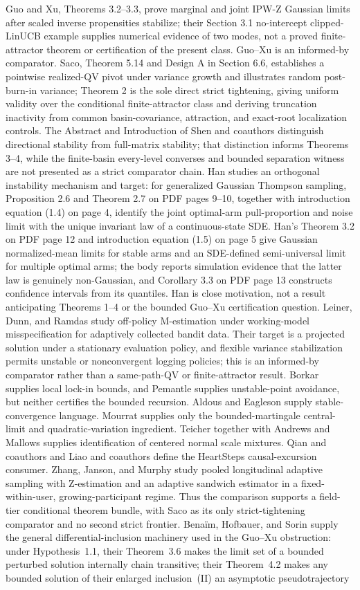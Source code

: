 Guo and Xu, Theorems 3.2--3.3, prove marginal and joint IPW-Z Gaussian limits after scaled inverse propensities stabilize; their Section 3.1 no-intercept clipped-LinUCB example supplies numerical evidence of two modes, not a proved finite-attractor theorem or certification of the present class. Guo--Xu is an informed-by comparator. Saco, Theorem 5.14 and Design A in Section 6.6, establishes a pointwise realized-QV pivot under variance growth and illustrates random post-burn-in variance; Theorem 2 is the sole direct strict tightening, giving uniform validity over the conditional finite-attractor class and deriving truncation inactivity from common basin-covariance, attraction, and exact-root localization controls. The Abstract and Introduction of Shen and coauthors distinguish directional stability from full-matrix stability; that distinction informs Theorems 3--4, while the finite-basin every-level converses and bounded separation witness are not presented as a strict comparator chain. Han studies an orthogonal instability mechanism and target: for generalized Gaussian Thompson sampling, Proposition 2.6 and Theorem 2.7 on PDF pages 9--10, together with introduction equation (1.4) on page 4, identify the joint optimal-arm pull-proportion and noise limit with the unique invariant law of a continuous-state SDE. Han's Theorem 3.2 on PDF page 12 and introduction equation (1.5) on page 5 give Gaussian normalized-mean limits for stable arms and an SDE-defined semi-universal limit for multiple optimal arms; the body reports simulation evidence that the latter law is genuinely non-Gaussian, and Corollary 3.3 on PDF page 13 constructs confidence intervals from its quantiles. Han is close motivation, not a result anticipating Theorems 1--4 or the bounded Guo--Xu certification question. Leiner, Dunn, and Ramdas study off-policy M-estimation under working-model misspecification for adaptively collected bandit data. Their target is a projected solution under a stationary evaluation policy, and flexible variance stabilization permits unstable or nonconvergent logging policies; this is an informed-by comparator rather than a same-path-QV or finite-attractor result. Borkar supplies local lock-in bounds, and Pemantle supplies unstable-point avoidance, but neither certifies the bounded recursion. Aldous and Eagleson supply stable-convergence language. Mourrat supplies only the bounded-martingale central-limit and quadratic-variation ingredient. Teicher together with Andrews and Mallows supplies identification of centered normal scale mixtures. Qian and coauthors and Liao and coauthors define the HeartSteps causal-excursion consumer. Zhang, Janson, and Murphy study pooled longitudinal adaptive sampling with Z-estimation and an adaptive sandwich estimator in a fixed-within-user, growing-participant regime. Thus the comparison supports a field-tier conditional theorem bundle, with Saco as its only strict-tightening comparator and no second strict frontier. Benaïm, Hofbauer, and Sorin supply the general differential-inclusion machinery used in the Guo--Xu obstruction: under Hypothesis~1.1, their Theorem~3.6 makes the limit set of a bounded perturbed solution internally chain transitive; their Theorem~4.2 makes any bounded solution of their enlarged inclusion~(II) an asymptotic pseudotrajectory 